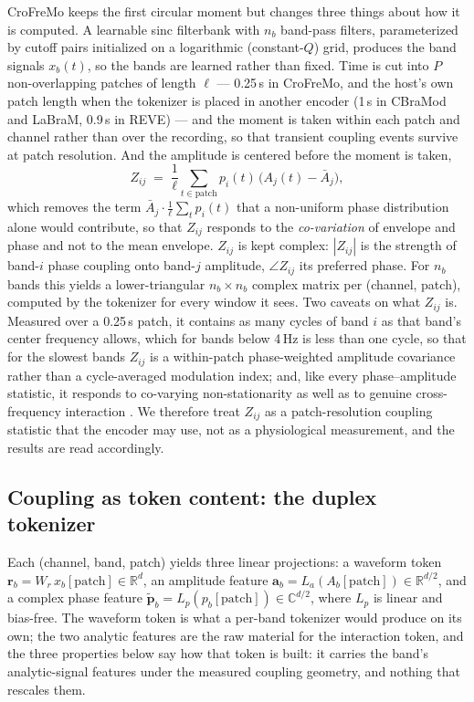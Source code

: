 CroFreMo keeps the first circular moment but changes three things about how
it is computed. A learnable sinc filterbank \citep{ravanelli2018sincnet}
with $n_b$ band-pass filters, parameterized by cutoff pairs initialized on
a logarithmic (constant-$Q$) grid, produces the band signals $x_b(t)$, so
the bands are learned rather than fixed. Time is cut into $P$
non-overlapping patches of length $\ell$ --- 0.25\,s in CroFreMo, and the
host's own patch length when the tokenizer is placed in another encoder
(1\,s in CBraMod and LaBraM, 0.9\,s in REVE) --- and the moment is
taken within each patch and channel rather than over the recording, so
that transient coupling events survive at patch resolution. And the
amplitude is centered before the moment is taken,
\begin{equation}
Z_{ij} \;=\; \frac{1}{\ell}\sum_{t \in \text{patch}}
p_i(t)\,\bigl(A_j(t) - \bar A_j\bigr),
\label{eq:mvl}
\end{equation}
which removes the term $\bar A_j \cdot \frac{1}{\ell}\sum_t p_i(t)$ that a
non-uniform phase distribution alone would contribute, so that $Z_{ij}$
responds to the \emph{co-variation} of envelope and phase and not to
the mean envelope. $Z_{ij}$ is kept complex: $|Z_{ij}|$ is the strength of
band-$i$ phase coupling onto band-$j$ amplitude, $\angle Z_{ij}$ its
preferred phase. For $n_b$ bands this yields a lower-triangular
$n_b \times n_b$ complex matrix per (channel, patch), computed by the
tokenizer for every window it sees. Two caveats on what $Z_{ij}$ is.
Measured over a 0.25\,s patch, it contains as many cycles of band $i$ as
that band's center frequency allows, which for bands below 4\,Hz is less
than one cycle, so that for the slowest bands $Z_{ij}$ is a within-patch
phase-weighted amplitude covariance rather than a cycle-averaged
modulation index; and, like every phase--amplitude statistic,
it responds to co-varying non-stationarity as well as to genuine
cross-frequency interaction \citep{aru2015untangling}. We therefore treat
$Z_{ij}$ as a patch-resolution coupling statistic that the encoder may
use, not as a physiological measurement, and the results are read
accordingly.

\subsection{Coupling as token content: the duplex tokenizer}
\label{sec:tokenizer}

Each (channel, band, patch) yields three linear projections: a waveform
token $\mathbf{r}_b = W_r\,x_b[\text{patch}] \in \mathbb{R}^d$, an
amplitude feature
$\mathbf{a}_b = L_a(A_b[\text{patch}]) \in \mathbb{R}^{d/2}$, and a complex
phase feature
$\tilde{\mathbf{p}}_b = L_p(p_b[\text{patch}]) \in \mathbb{C}^{d/2}$, where
$L_p$ is linear and bias-free. The waveform token is what a per-band
tokenizer would produce on its own; the two analytic features are the raw
material for the interaction token, and the three properties below say how
that token is built: it carries the band's analytic-signal features under the
measured coupling geometry, and nothing that rescales them.

